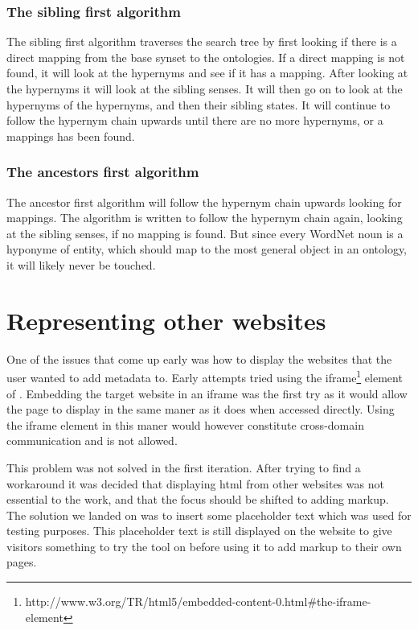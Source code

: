 \subsubsection{The sibling first algorithm}
The sibling first algorithm traverses the search tree by first looking if there is a direct mapping from the base synset to the ontologies.
If a direct mapping is not found, it will look at the hypernyms and see if it has a mapping.
After looking at the hypernyms it will look at the sibling senses.
It will then go on to look at the hypernyms of the hypernyms, and then their sibling states.
It will continue to follow the hypernym chain upwards until there are no more hypernyms, or a mappings has been found.

\subsubsection{The ancestors first algorithm}
The ancestor first algorithm will follow the hypernym chain upwards looking for mappings.
The algorithm is written to follow the hypernym chain again, looking at the sibling senses, if no mapping is found.
But since every WordNet noun is a hyponyme of {entity}, which should map to the most general object in an ontology,
it will likely never be touched.

\section{Representing other websites}
One of the issues that come up early was how to display the websites that the user wanted to add metadata to.
Early attempts tried using the iframe\footnote{http://www.w3.org/TR/html5/embedded-content-0.html\#the-iframe-element}
element of .
Embedding the target website in an iframe was the first try as it would allow the page to display in the same maner
as it does when accessed directly.
Using the iframe element in this maner would however constitute cross-domain communication and is not allowed.

This problem was not solved in the first iteration.
After trying to find a workaround it was decided that displaying html from other websites was not essential to the work,
and that the focus should be shifted to adding markup.
The solution we landed on was to insert some placeholder text which was used for testing purposes.
This placeholder text is still displayed on the website to give visitors something to try the tool on before using it
to add markup to their own pages.

